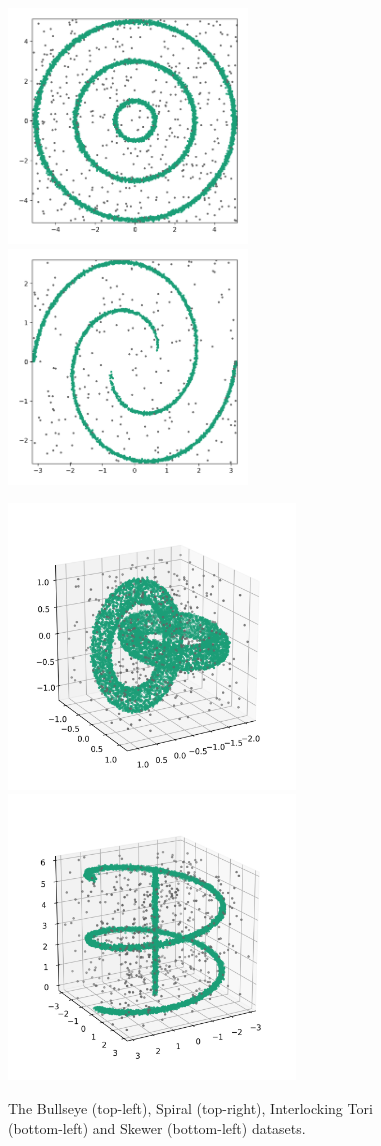 \begin{figure}[!t]
\centering
\includegraphics[width=2.5in]{static/bullseye.png}\includegraphics[width=2.5in]{static/spiral.png}

\includegraphics[width=3in]{static/interlocking_tori.png}\includegraphics[width=3in]{static/skewer.png}
\caption{The Bullseye (top-left), Spiral (top-right), Interlocking Tori (bottom-left) and Skewer (bottom-left) datasets.}
\label{results:datasets}
\end{figure}

